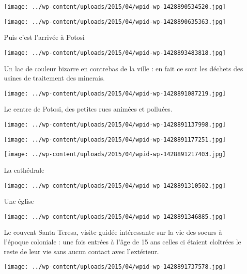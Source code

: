 \centerline{\texttt{[image: ../wp-content/uploads/2015/04/wpid-wp-1428890534520.jpg]} } 
 \newline
 \newline
\centerline{\texttt{[image: ../wp-content/uploads/2015/04/wpid-wp-1428890635363.jpg]} } 
 \newline
 Puis c'est l'arrivée à Potosi \newline
 \newline
\centerline{\texttt{[image: ../wp-content/uploads/2015/04/wpid-wp-1428893483818.jpg]} } 
 \newline
 Un lac de couleur bizarre en contrebas de la ville : en fait ce sont les déchets des usines de traitement des minerais. \newline
 \newline
\centerline{\texttt{[image: ../wp-content/uploads/2015/04/wpid-wp-1428891087219.jpg]} } 
 \newline
 Le centre de Potosi, des petites rues animées et polluées.  \newline
 \newline
\centerline{\texttt{[image: ../wp-content/uploads/2015/04/wpid-wp-1428891137998.jpg]} } 
 \newline
 \newline
\centerline{\texttt{[image: ../wp-content/uploads/2015/04/wpid-wp-1428891177251.jpg]} } 
 \newline
 \newline
\centerline{\texttt{[image: ../wp-content/uploads/2015/04/wpid-wp-1428891217403.jpg]} } 
 \newline
 La cathédrale \newline
 \newline
\centerline{\texttt{[image: ../wp-content/uploads/2015/04/wpid-wp-1428891310502.jpg]} } 
 \newline
 Une église \newline
 \newline
\centerline{\texttt{[image: ../wp-content/uploads/2015/04/wpid-wp-1428891346885.jpg]} } 
 \newline
 Le couvent Santa Teresa, visite guidée intéressante sur la vie des soeurs à l'époque coloniale : une fois entrées à l'âge de 15 ans celles ci étaient cloîtrées le reste de leur vie sans aucun contact avec l'extérieur.  \newline
 \newline
\centerline{\texttt{[image: ../wp-content/uploads/2015/04/wpid-wp-1428891737578.jpg]} } 
